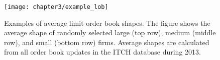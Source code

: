 
\begin{figure}[p]
	\linespread{1}
	\centering
	\texttt{[image: chapter3/example\_lob]}
	\captionsetup{skip=-20pt, font=footnotesize, justification=justified, width=\linewidth}
	\caption[Examples of average limit order book shapes]{Examples of average limit order book shapes. The figure shows the average shape of randomly selected large (top row), medium (middle row), and small (bottom row) firms. Average shapes are calculated from all order book updates in the ITCH database during 2013.}
	\label{fig:examples}
\end{figure}


